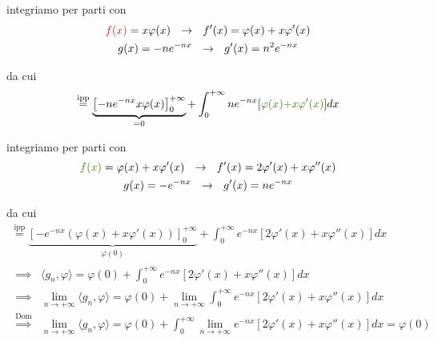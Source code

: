 \begin{enumerate}
integriamo per parti con\begin{gather*}
\textcolor[rgb]{0.82,0.01,0.11}{f}\textcolor[rgb]{0.82,0.01,0.11}{(}\textcolor[rgb]{0.82,0.01,0.11}{x}\textcolor[rgb]{0.82,0.01,0.11}{)} = x\varphi (x) \ \ \rightarrow \ \ f'(x) = \varphi (x) + x\varphi '(x)\\
g(x) = - ne^{ - nx} \ \ \rightarrow \ \ g'(x) = n^{2} e^{ - nx}
\end{gather*}

da cui\begin{equation*}
\overset{\text{ipp}}{ = }\underbrace{\left[ - ne^{ - nx} x\varphi (x)\right]^{ + \infty }_{0}}_{ = 0} + \int ^{ + \infty }_{0} ne^{ - nx}[\textcolor[rgb]{0.25,0.46,0.02}{\varphi }\textcolor[rgb]{0.25,0.46,0.02}{(}\textcolor[rgb]{0.25,0.46,0.02}{x}\textcolor[rgb]{0.25,0.46,0.02}{)}\textcolor[rgb]{0.25,0.46,0.02}{ + x\varphi '}\textcolor[rgb]{0.25,0.46,0.02}{(}\textcolor[rgb]{0.25,0.46,0.02}{x}\textcolor[rgb]{0.25,0.46,0.02}{)}] dx
\end{equation*}

integriamo per parti con\begin{gather*}
\textcolor[rgb]{0.25,0.46,0.02}{f}\textcolor[rgb]{0.25,0.46,0.02}{(}\textcolor[rgb]{0.25,0.46,0.02}{x}\textcolor[rgb]{0.25,0.46,0.02}{)} = \varphi (x) + x\varphi '(x) \ \ \rightarrow \ \ f'(x) = 2\varphi '(x) + x\varphi ''(x)\\
g(x) = - e^{ - nx} \ \ \rightarrow \ \ g'(x) = ne^{ - nx}
\end{gather*}

da cui\begin{gather*}
\overset{\text{ipp}}{ = }\underbrace{\left[ - e^{ - nx}(\varphi (x) + x\varphi '(x))\right]^{ + \infty }_{0}}_{\varphi (0)} + \int ^{ + \infty }_{0} e^{ - nx}[ 2\varphi '(x) + x\varphi ''(x)] dx\\
\begin{aligned}
\implies  & \langle g_{n} ,\varphi \rangle = \varphi (0) + \int ^{ + \infty }_{0} e^{ - nx}[ 2\varphi '(x) + x\varphi ''(x)] dx\\
\implies  & \lim\limits _{n\rightarrow + \infty } \langle g_{n} ,\varphi \rangle = \varphi (0) + \lim\limits _{n\rightarrow + \infty }\int ^{ + \infty }_{0} e^{ - nx}[ 2\varphi '(x) + x\varphi ''(x)] dx\\
\overset{\text{Dom}}{\implies } & \lim\limits _{n\rightarrow + \infty } \langle g_{n} ,\varphi \rangle = \varphi (0) + \int ^{ + \infty }_{0}\lim\limits _{n\rightarrow + \infty } e^{ - nx}[ 2\varphi '(x) + x\varphi ''(x)] dx = \varphi (0)
\end{aligned}
\end{gather*}


\end{enumerate}
